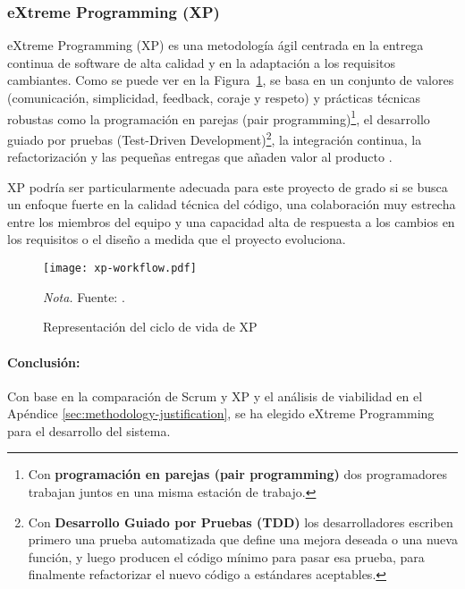 \subsubsection{eXtreme Programming (XP)}
eXtreme Programming (XP) es una metodología ágil centrada en la entrega continua de software de alta calidad y en la adaptación a los requisitos cambiantes.
Como se puede ver en la Figura~\ref{fig:xpWorkflowA}, se basa en un conjunto de valores (comunicación, simplicidad, feedback, coraje y respeto) y prácticas técnicas robustas como la programación en parejas (pair programming)\footnote{Con \textbf{programación en parejas (pair programming)} dos programadores trabajan juntos en una misma estación de trabajo.}, el desarrollo guiado por pruebas (Test-Driven Development)\footnote{Con \textbf{Desarrollo Guiado por Pruebas (TDD)} los desarrolladores escriben primero una prueba automatizada que define una mejora deseada o una nueva función, y luego producen el código mínimo para pasar esa prueba, para finalmente refactorizar el nuevo código a estándares aceptables.}, la integración continua, la refactorización y las pequeñas entregas que añaden valor al producto \parencite{Beck2004}.

XP podría ser particularmente adecuada para este proyecto de grado si se busca un enfoque fuerte en la calidad técnica del código, una colaboración muy estrecha entre los miembros del equipo y una capacidad alta de respuesta a los cambios en los requisitos o el diseño a medida que el proyecto evoluciona.

\begin{figure}
    \centering
    \caption{Representación del ciclo de vida de XP}\label{fig:xpWorkflowA}
    \texttt{[image: xp-workflow.pdf]}

    \vspace{0.5em}
    \begin{minipage}{\textwidth}
        \small\textit{Nota.} Fuente: \textcite{abrahamsson2017agile}.
    \end{minipage}
\end{figure}

\paragraph{Conclusión:}
Con base en la comparación de Scrum y XP y el análisis de viabilidad en el Apéndice \ref{sec:methodology-justification}, se ha elegido eXtreme Programming para el desarrollo del sistema.
